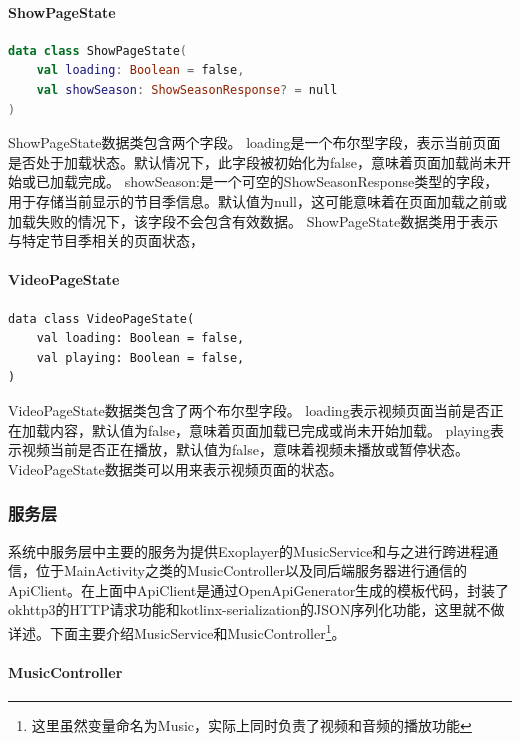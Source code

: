 \documentclass[main.tex]{subfiles}
\begin{document}
\paragraph{ShowPageState}

\begin{lstlisting}[language=Kotlin]
data class ShowPageState(
    val loading: Boolean = false,
    val showSeason: ShowSeasonResponse? = null
)
\end{lstlisting}

ShowPageState数据类包含两个字段。
loading是一个布尔型字段，表示当前页面是否处于加载状态。默认情况下，此字段被初始化为false，意味着页面加载尚未开始或已加载完成。
showSeason:是一个可空的ShowSeasonResponse类型的字段，用于存储当前显示的节目季信息。默认值为null，这可能意味着在页面加载之前或加载失败的情况下，该字段不会包含有效数据。
ShowPageState数据类用于表示与特定节目季相关的页面状态，

\paragraph{VideoPageState}

\begin{lstlisting}
data class VideoPageState(
    val loading: Boolean = false,
    val playing: Boolean = false,
)
\end{lstlisting}

VideoPageState数据类包含了两个布尔型字段。
loading表示视频页面当前是否正在加载内容，默认值为false，意味着页面加载已完成或尚未开始加载。
playing表示视频当前是否正在播放，默认值为false，意味着视频未播放或暂停状态。
VideoPageState数据类可以用来表示视频页面的状态。

\subsubsection{服务层}

系统中服务层中主要的服务为提供Exoplayer的MusicService和与之进行跨进程通信，位于MainActivity之类的MusicController以及同后端服务器进行通信的ApiClient。在上面中ApiClient是通过OpenApiGenerator生成的模板代码，封装了okhttp3的HTTP请求功能和kotlinx-serialization的JSON序列化功能，这里就不做详述。下面主要介绍MusicService和MusicController\footnote{这里虽然变量命名为Music，实际上同时负责了视频和音频的播放功能}。

\paragraph{MusicController}
\end{document}
